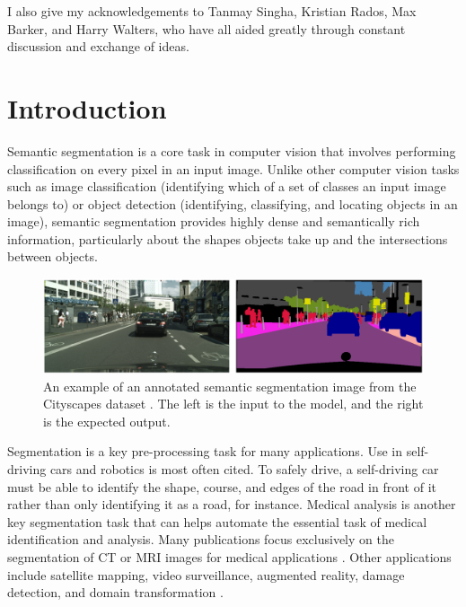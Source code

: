 \documentclass[a4paper,12pt]{report}
\begin{document}
\noindent I also give my acknowledgements to Tanmay Singha, Kristian Rados, Max Barker, and Harry Walters, who have all aided greatly through constant discussion and exchange of ideas.

\newpage
\tableofcontents
\newpage
\listoffigures
\newpage
\listoftables
\newpage
\thispagestyle{empty}

% 
% 

\chapter{Introduction}
Semantic segmentation is a core task in computer vision that involves performing classification on every pixel in an input image. Unlike other computer vision tasks such as image classification (identifying which of a set of classes an input image belongs to) or object detection (identifying, classifying, and locating objects in an image), semantic segmentation provides highly dense and semantically rich information, particularly about the shapes objects take up and the intersections between objects.

\begin{figure}[h]
    \centering
    \includegraphics[width=\textwidth]{res/cityscapes-segmentation-sample.png}
    \caption{An example of an annotated semantic segmentation image from the Cityscapes dataset \cite{cordts_cityscapes_2016}. The left is the input to the model, and the right is the expected output.}
    \label{fig:cityscapes_segmentation_example}
\end{figure}

Segmentation is a key pre-processing task for many applications. Use in self-driving cars and robotics is most often cited. To safely drive, a self-driving car must be able to identify the shape, course, and edges of the road in front of it rather than only identifying it as a road, for instance. Medical analysis is another key segmentation task that can helps automate the essential task of medical identification and analysis. Many publications focus exclusively on the segmentation of CT or MRI images for medical applications \cite{hesamian_deep_2019}. Other applications include satellite mapping, video surveillance, augmented reality, damage detection, and domain transformation \cite{richter_enhancing_2021}.
\end{document}
